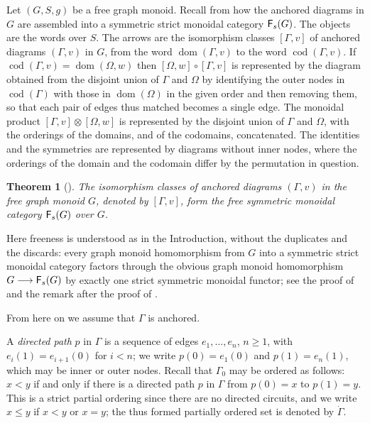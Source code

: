 \documentclass[12pt]{amsart}
\theoremstyle{plain}
\newtheorem{thm}{Theorem}[section]
\theoremstyle{definition}
\theoremstyle{remark}
\numberwithin{equation}{section}
\theoremstyle{plain}
\DeclareMathOperator{\dom}{dom}
\DeclareMathOperator{\cod}{cod}
\newcommand{\0}{\emptyset}
\newcommand{\fun}{\longrightarrow}
\newcommand{\cat}[1]{\textup{\textsf{#1}}}
\newcommand{\memph}[1]{{\color{magenta}\emph{#1}}}
\begin{document}
Let $(G, S, g)$ be a free graph monoid. Recall from \cite[Chapter~2, \S~2]{joyal1991geometry} how the anchored diagrams in $G$ are assembled into a symmetric strict monoidal category $\cat F_s(G)$. The objects are the words over $S$. The arrows are the isomorphism classes $[\Gamma, v]$ of anchored diagrams $(\Gamma, v)$ in $G$, from the word $\dom(\Gamma, v)$ to the word $\cod(\Gamma, v)$. If $\cod(\Gamma, v) = \dom(\Omega, w)$ then $[\Omega, w] \circ [\Gamma, v]$ is represented by the diagram obtained from the disjoint union of $\Gamma$ and $\Omega$ by identifying the outer nodes in $\cod(\Gamma)$ with those in $\dom(\Omega)$ in the given order and then removing them, so that each pair of edges thus matched becomes a single edge. The monoidal product $[\Gamma, v] \otimes [\Omega, w]$ is represented by the disjoint union of $\Gamma$ and $\Omega$, with the orderings of the domains, and of the codomains, concatenated. The identities and the symmetries are represented by diagrams without inner nodes, where the orderings of the domain and the codomain differ by the permutation in question.

\begin{thm}[{\cite[Theorem~2.3]{joyal1991geometry}}]\label{free:sym}
The isomorphism classes of anchored diagrams $(\Gamma, v)$ in the free  graph monoid $G$, denoted by $[\Gamma, v]$, form the free symmetric monoidal category $\cat F_s(G)$ over $G$.
\end{thm}

Here freeness is understood as in the Introduction, without the duplicates and the discards: every graph monoid homomorphism from $G$ into a symmetric strict monoidal category factors through the obvious graph monoid homomorphism $G \fun \cat F_s(G)$ by exactly one strict symmetric monoidal functor; see the proof of \cite[Theorem~2.3]{joyal1991geometry} and the remark after the proof of \cite[Theorem~1.2]{joyal1991geometry}.

From here on we assume that $\Gamma$ is anchored.

A \memph{directed path} $p$ in $\Gamma$ is a sequence of edges $e_1, \ldots, e_n$, $n \geq 1$, with $e_i(1) = e_{i+1}(0)$ for $i < n$; we write $p(0) = e_1(0)$ and $p(1) = e_n(1)$, which may be inner or outer nodes. Recall  that  $\Gamma_0$  may be ordered as follows: $x < y$ if and only if there is a directed path $p$ in $\Gamma$ from $p(0) = x$ to $p(1) = y$. This is a strict partial ordering since there are no directed circuits, and we write $x \leq y$ if $x < y$ or $x = y$; the thus formed  partially ordered set is denoted by $\dot\Gamma$.
\end{document}
